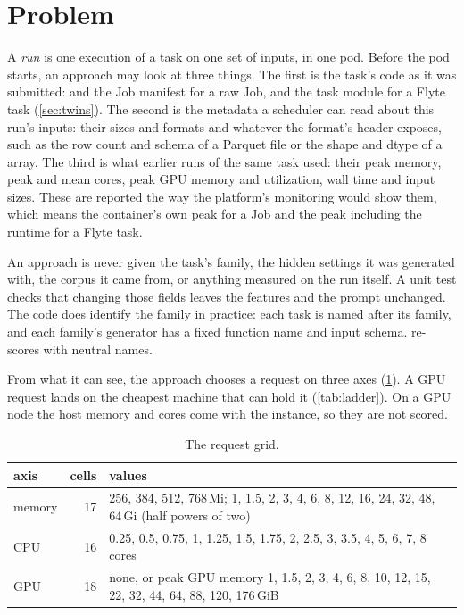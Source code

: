 \section{Problem}
\label{sec:problem}

A \emph{run} is one execution of a task on one set of inputs, in one pod. Before the pod starts, an approach
may look at three things. The first is the task's code as it was submitted:  and the Job manifest
for a raw Job, and the task module for a Flyte task (\cref{sec:twins}). The second is the metadata a scheduler
can read about this run's inputs: their sizes and formats and whatever the format's header exposes, such as
the row count and schema of a Parquet file or the shape and dtype of a  array. The third is what
earlier runs of the same task used: their peak memory, peak and mean cores, peak GPU memory and utilization,
wall time and input sizes. These are reported the way the platform's monitoring would show them, which means
the container's own peak for a Job and the peak including the runtime for a Flyte task.

An approach is never given the task's family, the hidden settings it was generated with, the corpus it came
from, or anything measured on the run itself. A unit test checks that changing those fields leaves the
features and the prompt unchanged. The code does identify the family in practice: each task is named after its
family, and each family's generator has a fixed function name and input schema. 
re-scores with neutral names.

From what it can see, the approach chooses a request on three axes (\cref{tab:grid}). A GPU request lands on
the cheapest machine that can hold it (\cref{tab:ladder}). On a GPU node the host memory and cores come with
the instance, so they are not scored.

\begin{table}[tbp]
\centering\small
\caption{The request grid.}
\label{tab:grid}
\begin{tabular}{@{}lrl@{}}
\toprule
axis & cells & values \\
\midrule
memory & 17 & 256, 384, 512, 768\,Mi; 1, 1.5, 2, 3, 4, 6, 8, 12, 16, 24, 32, 48, 64\,Gi (half powers of two) \\
CPU    & 16 & 0.25, 0.5, 0.75, 1, 1.25, 1.5, 1.75, 2, 2.5, 3, 3.5, 4, 5, 6, 7, 8 cores \\
GPU    & 18 & none, or peak GPU memory 1, 1.5, 2, 3, 4, 6, 8, 10, 12, 15, 22, 32, 44, 64, 88, 120, 176\,GiB \\
\bottomrule
\end{tabular}
\end{table}

